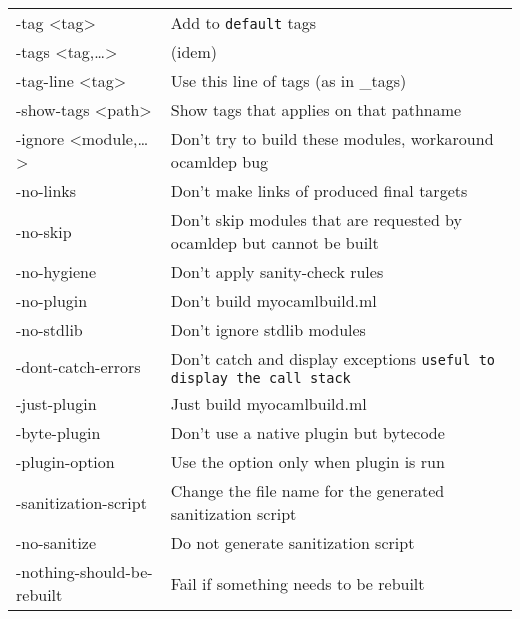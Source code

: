 \documentclass[11pt]{article}
\begin{document}
\begin{table}[htb]
\begin{center}
\begin{tabular}{ll}
\hline
 -tag <tag>                  &  Add to \texttt{default} tags                                                  \\
 -tags <tag,\ldots{}>        &  (idem)                                                                        \\
 -tag-line <tag>             &  Use this line of tags (as in \_{}tags)                                        \\
 -show-tags <path>           &  Show tags that applies on that pathname                                       \\
\hline
 -ignore <module,\ldots{}>   &  Don't try to build these modules, workaround ocamldep bug                     \\
 -no-links                   &  Don't make links of produced final targets                                    \\
 -no-skip                    &  Don't skip modules that are requested by ocamldep but cannot be built         \\
 -no-hygiene                 &  Don't apply sanity-check rules                                                \\
 -no-plugin                  &  Don't build myocamlbuild.ml                                                   \\
 -no-stdlib                  &  Don't ignore stdlib modules                                                   \\
 -dont-catch-errors          &  Don't catch and display exceptions \texttt{useful to display the call stack}  \\
\hline
 -just-plugin                &  Just build myocamlbuild.ml                                                    \\
 -byte-plugin                &  Don't use a native plugin but bytecode                                        \\
 -plugin-option              &  Use the option only when plugin is run                                        \\
 -sanitization-script        &  Change the file name for the generated sanitization script                    \\
 -no-sanitize                &  Do not generate sanitization script                                           \\
 -nothing-should-be-rebuilt  &  Fail if something needs to be rebuilt                                         \\

\end{tabular}
\end{center}
\end{table}
\end{document}
